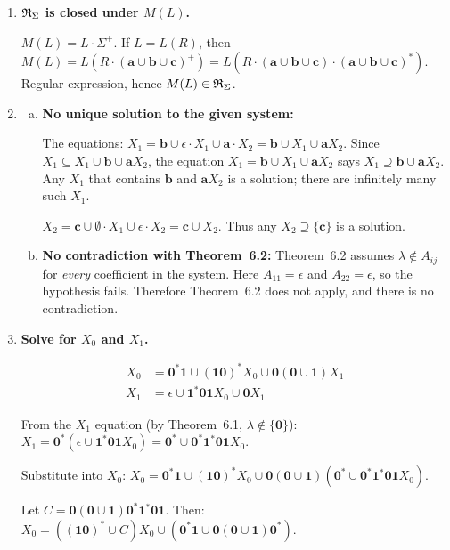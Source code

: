 \begin{enumerate}[{6.}1.]
\item \textbf{$\mathfrak{R}_\Sigma$ is closed under $M(L)$.}

$M(L)=L\cdot\Sigma^+$.  If $L=L(R)$, then $M(L)=L(R\cdot(\pmb{a}\cup\pmb{b}\cup\pmb{c})^+)=L(R\cdot(\pmb{a}\cup\pmb{b}\cup\pmb{c})\cdot(\pmb{a}\cup\pmb{b}\cup\pmb{c})^*)$.  Regular expression, hence $M(L)\in\mathfrak{R}_\Sigma$.

\item \begin{enumerate}[(a)]
  \item \textbf{No unique solution to the given system:}

  The equations:
  $X_1=\pmb{b}\cup\epsilon\cdot X_1\cup\pmb{a}\cdot X_2=\pmb{b}\cup X_1\cup\pmb{a}X_2$.
  Since $X_1\subseteq X_1\cup\pmb{b}\cup\pmb{a}X_2$, the equation $X_1=\pmb{b}\cup X_1\cup\pmb{a}X_2$ says $X_1\supseteq\pmb{b}\cup\pmb{a}X_2$.  Any $X_1$ that contains $\pmb{b}$ and $\pmb{a}X_2$ is a solution; there are infinitely many such $X_1$.

  $X_2=\pmb{c}\cup\emptyset\cdot X_1\cup\epsilon\cdot X_2=\pmb{c}\cup X_2$.  Thus any $X_2\supseteq\{\pmb{c}\}$ is a solution.

  \item \textbf{No contradiction with Theorem~6.2:}  Theorem~6.2 assumes
  $\lambda\notin A_{ij}$ for \emph{every} coefficient in the system.  Here
  $A_{11}=\epsilon$ and $A_{22}=\epsilon$, so the hypothesis fails.  Therefore
  Theorem~6.2 does not apply, and there is no contradiction.
\end{enumerate}

\item \textbf{Solve for $X_0$ and $X_1$.}

\begin{align*}
  X_0 &= \pmb{0}^*\pmb{1} \cup (\pmb{10})^*X_0 \cup \pmb{0}(\pmb{0}\cup\pmb{1})X_1 \\
  X_1 &= \epsilon \cup \pmb{1}^*\pmb{01}X_0 \cup \pmb{0}X_1
\end{align*}

From the $X_1$ equation (by Theorem~6.1, $\lambda\notin\{\pmb{0}\}$):
$X_1=\pmb{0}^*(\epsilon\cup\pmb{1}^*\pmb{01}X_0)=\pmb{0}^*\cup\pmb{0}^*\pmb{1}^*\pmb{01}X_0$.

Substitute into $X_0$:
$X_0=\pmb{0}^*\pmb{1}\cup(\pmb{10})^*X_0\cup\pmb{0}(\pmb{0}\cup\pmb{1})(\pmb{0}^*\cup\pmb{0}^*\pmb{1}^*\pmb{01}X_0)$.

Let $C=\pmb{0}(\pmb{0}\cup\pmb{1})\pmb{0}^*\pmb{1}^*\pmb{01}$. Then:
$X_0=((\pmb{10})^*\cup C)X_0\cup(\pmb{0}^*\pmb{1}\cup\pmb{0}(\pmb{0}\cup\pmb{1})\pmb{0}^*)$.


\end{enumerate}
